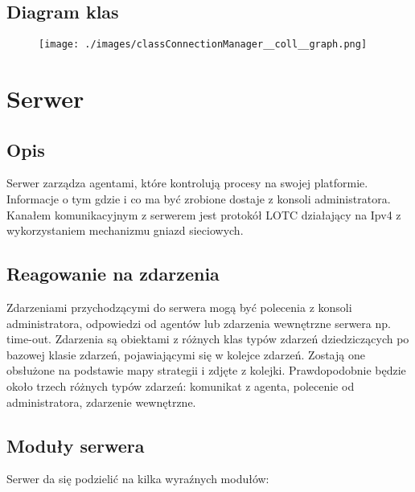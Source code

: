 \documentclass[10pt,a4paper]{article}
\begin{document}
		\subsection{Diagram klas}
		    \begin{figure}[H]
				\texttt{[image: ./images/classConnectionManager\_\_coll\_\_graph.png]}
			\end{figure}
    
    \section{Serwer}
			
		\subsection{Opis}
			Serwer zarządza agentami, które kontrolują procesy na swojej platformie. Informacje o tym gdzie i co ma być zrobione dostaje z konsoli administratora. Kanałem komunikacyjnym z serwerem jest protokół LOTC działający na Ipv4 z wykorzystaniem mechanizmu gniazd sieciowych. \\
		
		\subsection{Reagowanie na zdarzenia}
			Zdarzeniami przychodzącymi do serwera mogą być polecenia z konsoli administratora, odpowiedzi od agentów lub zdarzenia wewnętrzne serwera np. time-out. Zdarzenia są obiektami z różnych klas typów zdarzeń dziedziczących po bazowej klasie zdarzeń, pojawiającymi się w kolejce zdarzeń. Zostają one obsłużone na podstawie mapy strategii i zdjęte z kolejki. Prawdopodobnie będzie około trzech różnych typów zdarzeń: komunikat z agenta, polecenie od administratora, zdarzenie wewnętrzne.
		
		\subsection{Moduły serwera}
			Serwer da się podzielić na kilka wyraźnych modułów: \\
			
\end{document}
